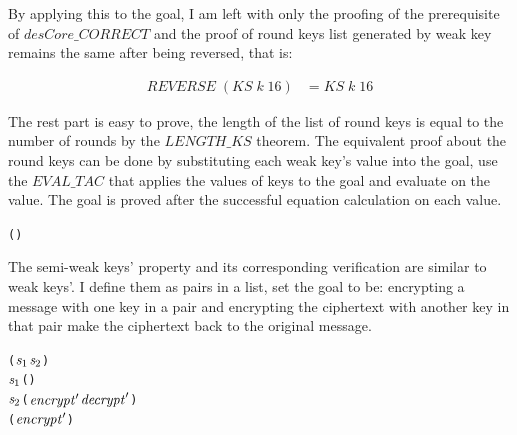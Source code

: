 \documentclass{article}
\begin{document}
By applying this to the goal, I am left with only the proofing of the prerequisite of $desCore\_CORRECT$ and the
proof of round keys list generated by weak key remains the same after being reversed, that is:

\begin{equation}
\begin{split}
   REVERSE \; (KS \; k \; 16) &= KS \; k \; 16
\end{split}
\end{equation}


The rest part is easy to prove, the length of the list of round keys is equal to the number of rounds by the $LENGTH\_KS$
theorem. The equivalent proof about the round keys can be done by substituting each weak key's value into the goal,
use the $EVAL\_TAC$ that applies the values of keys to the goal and evaluate on the value. The goal is proved after
the successful equation calculation on each value.

\begin{alltt}
   \HOLTokenTurnstile{}  (  ) \HOLSymConst{=} 
\end{alltt}

The semi-weak keys' property and its corresponding verification are similar to weak keys'. I define them as pairs in a list,
set the goal to be: encrypting a message with one key in a pair and encrypting the ciphertext with another key
in that pair make the ciphertext back to the original message.

\begin{alltt}
   \HOLTokenTurnstile{}    \HOLSymConst{\HOLTokenConj{}}  \HOLSymConst{=} (\ensuremath{\HOLFreeVar{s}\sb{\mathrm{1}}}\HOLSymConst{,}\ensuremath{\HOLFreeVar{s}\sb{\mathrm{2}}}) \HOLSymConst{\HOLTokenConj{}}
    \ensuremath{\HOLFreeVar{s}\sb{\mathrm{1}}} \HOLSymConst{=} (\HOLSymConst{,}) \HOLSymConst{\HOLTokenConj{}}
    \ensuremath{\HOLFreeVar{s}\sb{\mathrm{2}}} \HOLSymConst{=} (\ensuremath{\HOLFreeVar{encrypt}\sp{\prime{}}}\HOLSymConst{,}\ensuremath{\HOLFreeVar{decrypt}\sp{\prime{}}}) \HOLSymConst{\HOLTokenImp{}}
    (\ensuremath{\HOLFreeVar{encrypt}\sp{\prime{}}} ) \HOLSymConst{=} 
\end{alltt}
\end{document}
